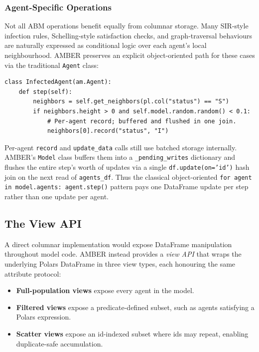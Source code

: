 \documentclass[11pt,a4paper]{article}
\begin{document}
\subsubsection{Agent-Specific Operations}

Not all ABM operations benefit equally from columnar storage. Many SIR-style infection rules, Schelling-style satisfaction checks, and graph-traversal behaviours are naturally expressed as conditional logic over each agent's local neighbourhood. AMBER preserves an explicit object-oriented path for these cases via the traditional \texttt{Agent} class:

\begin{lstlisting}[caption={Per-agent logic using the object-oriented path}]
class InfectedAgent(am.Agent):
    def step(self):
        neighbors = self.get_neighbors(pl.col("status") == "S")
        if neighbors.height > 0 and self.model.random.random() < 0.1:
            # Per-agent record; buffered and flushed in one join.
            neighbors[0].record("status", "I")
\end{lstlisting}

Per-agent \texttt{record} and \texttt{update\_data} calls still use batched storage internally. AMBER's \texttt{Model} class buffers them into a \texttt{\_pending\_writes} dictionary and flushes the entire step's worth of updates via a single \texttt{df.update(on='id')} hash join on the next read of \texttt{agents\_df}. Thus the classical object-oriented \texttt{for agent in model.agents: agent.step()} pattern pays one DataFrame update per step rather than one update per agent.

\subsection{The View API}

A direct columnar implementation would expose DataFrame manipulation throughout model code. AMBER instead provides a \emph{view API} that wraps the underlying Polars DataFrame in three view types, each honouring the same attribute protocol:

\begin{itemize}
\item \textbf{Full-population views} expose every agent in the model.
\item \textbf{Filtered views} expose a predicate-defined subset, such as agents satisfying a Polars expression.
\item \textbf{Scatter views} expose an id-indexed subset where ids may repeat, enabling duplicate-safe accumulation.
\end{itemize}
\end{document}

